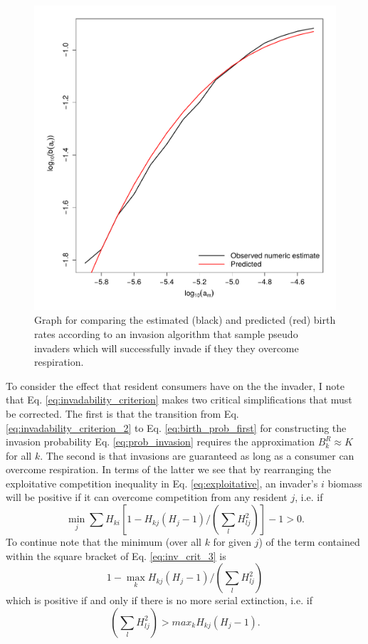 \documentclass[a4paper]{report}
\DeclareMathOperator{\min}{min}
\DeclareMathOperator{\max}{max}
\begin{document}
{%
\begin{figure}[H]
\caption{Graph for comparing the estimated (black) and predicted (red) birth rates according to an invasion algorithm that sample pseudo invaders which will successfully invade if they they overcome respiration. \label{fig:birth_rate_no_comp}}
\centering{}
\includegraphics[scale=0.6]{../Images/Birth_rate_no_comp.pdf}
\end{figure}
 
  To consider the effect that resident consumers have on the the invader, I note that Eq. \eqref{eq:invadability_criterion} makes two critical simplifications that must be corrected. The first is that the transition from Eq. \eqref{eq:invadability_criterion_2} to Eq. \eqref{eq:birth_prob_first} for constructing the invasion probability Eq. \eqref{eq:prob_invasion} requires the approximation $B^R_k \approx K$ for all $k$. The second is that invasions are guaranteed as long as a consumer can overcome respiration. In terms of the latter we see that by rearranging the exploitative competition inequality in Eq. \eqref{eq:exploitative}, an invader's $i$ biomass will be positive if it can overcome competition from any resident $j$, i.e. if 
\begin{equation}
\min_j \sum H_{ki} [ 1 - H_{kj} (H_j-1)/(\sum_l H^2_{lj}) ] - 1 > 0. \label{eq:inv_crit_3}
\end{equation}
To continue note that the minimum (over all $k$ for given $j$) of the term contained within the square bracket of  Eq. \eqref{eq:inv_crit_3} is 
\begin{equation}
1 - \max_k H_{kj}(H_j-1)/(\sum_l H^2_{lj}) \label{eq:cor_fact}
\end{equation}
which is positive if and only if there is no more serial extinction, i.e. if
\begin{equation}
(\sum_l H^2_{lj}) > max_k H_{kj}(H_j-1).
\end{equation}

}
\end{document}
